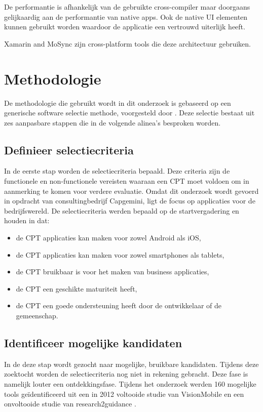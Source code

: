 \documentclass[a4paper]{IEEEconf}
\begin{document}
De performantie is afhankelijk van de gebruikte cross-compiler maar doorgaans gelijkaardig aan de performantie van native apps. Ook de native UI elementen kunnen gebruikt worden waardoor de applicatie een vertrouwd uiterlijk heeft.

Xamarin and MoSync zijn cross-platform tools die deze architectuur gebruiken.

\section{Methodologie}

De methodologie die gebruikt wordt in dit onderzoek is gebaseerd op een generische software selectie methode, voorgesteld door \citet{Jadhav:2011}. Deze selectie bestaat uit zes aanpasbare stappen die in de volgende alinea's besproken worden.

\subsection{Definieer selectiecriteria}

In de eerste stap worden de selectiecriteria bepaald. Deze criteria zijn de functionele en non-functionele vereisten waaraan een CPT moet voldoen om in aanmerking te komen voor verdere evaluatie. Omdat dit onderzoek wordt gevoerd in opdracht van consultingbedrijf Capgemini, ligt de focus op applicaties voor de bedrijfswereld. De selectiecriteria werden bepaald op de startvergadering en houden in dat:

\begin{itemize}
    \item de CPT applicaties kan maken voor zowel Android als iOS,
    \item de CPT applicaties kan maken voor zowel smartphones als tablets,
    \item de CPT bruikbaar is voor het maken van business applicaties,
    \item de CPT een geschikte maturiteit heeft,
    \item de CPT een goede ondersteuning heeft door de ontwikkelaar of de gemeenschap.
\end{itemize}

\subsection{Identificeer mogelijke kandidaten}

In de deze stap wordt gezocht naar mogelijke, bruikbare kandidaten. Tijdens deze zoektocht worden de selectiecriteria nog niet in rekening gebracht. Deze fase is namelijk louter een ontdekkingsfase. Tijdens het onderzoek werden 160 mogelijke tools ge\"identificeerd uit een in 2012 voltooide studie van VisionMobile \cite{VMCPT:2012} en een onvoltooide studie van  research2guidance \cite{Research2guidance}. 
\end{document}
